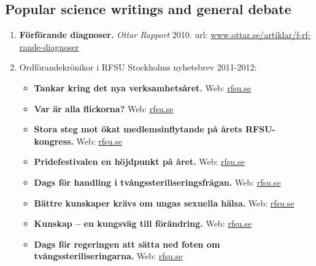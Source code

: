 \documentclass[10pt]{article}
\begin{document}
\subsection*{Popular science writings and general debate}
\begin{enumerate}[nolistsep]
\item {\bf Förförande diagnoser.} \emph{Ottar Rapport} 2010.
url: \href{http://www.ottar.se/artiklar/f-rf-rande-diagnoser}{www.ottar.se/artiklar/f-rf-rande-diagnoser}
\item Ordförandekrönikor i RFSU Stockholms nyhetsbrev 2011-2012:
	\begin{itemize}[nolistsep]
	\item {\bf Tankar kring det nya verksamhetsåret.} Web: \href{http://www.rfsu.se/sv/RFSU-nara-dig/RFSU-Stockholm/Nyhetsbrev/Mars-2011/Ordforandens-rader/}{rfsu.se}
	\item {\bf Var är alla flickorna?} Web: \href{http://www.rfsu.se/sv/RFSU-nara-dig/RFSU-Stockholm/Nyhetsbrev/Nummer-3/Var-ar-alla-flickorna/}{rfsu.se}
	\item {\bf Stora steg mot ökat medlemsinflytande på årets RFSU-kongress.} Web: \href{http://www.rfsu.se/sv/RFSU-nara-dig/RFSU-Stockholm/Nyhetsbrev/Nummer-4-2011/Stora-steg-mot-okat-medlemsinflytande-pa-arets-RFSU-kongress/}{rfsu.se}
	\item {\bf Pridefestivalen en höjdpunkt på året.} Web: \href{http://www.rfsu.se/sv/RFSU-nara-dig/RFSU-Stockholm/Nyhetsbrev/Nummer-5-2011/Pridefestivalen-en-hojdpunkt-pa-aret/}{rfsu.se}
	\item {\bf Dags för handling i tvångssteriliseringsfrågan.} Web: \href{http://www.rfsu.se/sv/RFSU-nara-dig/RFSU-Stockholm/Nyhetsbrev/Nyhetsbrev-52011/Dags-for-handling-i-tvangssteriliseringsfragan/}{rfsu.se}
	\item {\bf Bättre kunskaper krävs om ungas sexuella hälsa.} Web: \href{http://www.rfsu.se/sv/RFSU-nara-dig/RFSU-Stockholm/Nyhetsbrev/Nyhetsbrev-72011/Battre-kunskaper-kravs-om-ungdomars-sexuella-halsa/}{rfsu.se}
	\item {\bf Kunskap – en kungsväg till förändring.} Web: \href{http://www.rfsu.se/sv/RFSU-nara-dig/RFSU-Stockholm/Nyhetsbrev/Nyhetsbrev-72011/Battre-kunskaper-kravs-om-ungdomars-sexuella-halsa/}{rfsu.se}
	\item {\bf Dags för regeringen att sätta ned foten om tvångssteriliseringarna.} Web: \href{http://www.rfsu.se/sv/RFSU-nara-dig/RFSU-Stockholm/Nyhetsbrev/Nyhetsbrev-12012/Dags-for-regeringen-att-satta-ned-foten-om-tvangssteriliseringarna/}{rfsu.se}
	\end{itemize}

\end{enumerate}
\end{document}
